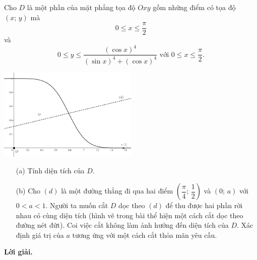 \begin{tcolorbox}[title=\textbf{Bài toán B.5.},breakable]
    Cho $D$ là một phần của mặt phẳng tọa độ $Oxy$ gồm những điểm có tọa độ $(x;\,y)$ mà $$0 \leq x \leq \dfrac{\pi}{2}$$ và $$0 \leq y \leq \dfrac{(\cos x)^4}{(\sin x)^4 + (\cos x)^4}\text{ với }0 \leq x \leq \dfrac{\pi}{2}.$$
    \begin{center}
        \includegraphics[width=0.5\textwidth]{Figures/05.png}
    \end{center}
    \begin{enumerate}
        \item[(a)] {Tính diện tích của $D$.}
        \item[(b)] {Cho $(d)$ là một đường thẳng đi qua hai điểm $\left(\dfrac{\pi}{4};\,\dfrac{1}{2}\right)$ và $(0;\,a)$ với $0 < a < 1$. Người ta muốn cắt $D$ dọc theo $(d)$ để thu được hai phần rời nhau có cùng diện tích (hình vẽ trong bài thể hiện một cách cắt dọc theo đường nét đứt). Coi việc cắt không làm ảnh hưởng đến diện tích của $D$. Xác định giá trị của $a$ tương ứng với một cách cắt thỏa mãn yêu cầu.} 
    \end{enumerate}
\end{tcolorbox}

\textbf{Lời giải. }

